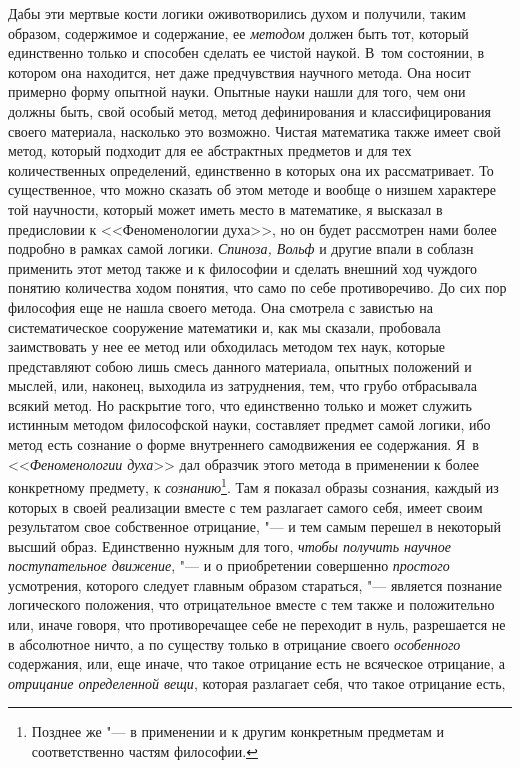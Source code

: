 Дабы эти мертвые кости логики оживотворились духом и получили, таким
образом, содержимое и содержание, ее {\em методом}
должен быть тот, который единственно только и способен сделать ее чистой
наукой. В~том состоянии, в котором она находится, нет даже предчувствия
научного метода. Она носит примерно форму опытной науки. Опытные науки
нашли для того, чем они должны быть, свой особый метод, метод дефинирования
и классифицирования своего материала, насколько это возможно. Чистая
математика также имеет свой метод, который подходит для ее абстрактных
предметов и для тех количественных определений, единственно в которых она
их рассматривает. То существенное, что можно сказать об этом методе и
вообще о низшем характере той научности, который может иметь место в
математике, я высказал в предисловии к <<Феноменологии духа>>, но он будет
рассмотрен нами более подробно в рамках самой логики.
{\em Спиноза, Вольф} и другие
впали в соблазн применить этот метод также и к философии и сделать внешний
ход чуждого понятию количества ходом понятия, что само по себе
противоречиво. До сих пор философия еще не нашла своего метода. Она
смотрела с завистью на систематическое сооружение математики и, как мы
сказали, пробовала заимствовать у нее ее метод или обходилась методом тех
наук, которые представляют собою лишь смесь данного материала, опытных
положений и мыслей, или, наконец, выходила из затруднения, тем, что грубо
отбрасывала всякий метод. Но раскрытие того, что единственно только и может
служить истинным методом философской науки, составляет предмет самой
логики, ибо метод есть сознание о форме внутреннего самодвижения ее
содержания. Я~в <<{\em Феноменологии духа}>> дал образчик
этого метода в применении к более конкретному предмету, к
{\em сознанию}\footnote{Позднее же "--- в применении
и к другим конкретным предметам и соответственно частям философии.}.
Там я показал образы сознания, каждый из которых в своей реализации вместе
с тем разлагает самого себя, имеет своим результатом свое собственное
отрицание, "--- и тем самым перешел в некоторый высший образ. Единственно
нужным для того, {\em чтобы получить научное
поступательное движение}, "--- и о приобретении совершенно
{\em простого} усмотрения, которого следует главным
образом стараться, "--- является познание логического положения, что
отрицательное вместе с тем также и положительно или, иначе говоря, что
противоречащее себе не переходит в нуль, разрешается не в абсолютное ничто,
а по существу только в отрицание своего
{\em особенного} содержания, или, еще иначе, что такое
отрицание есть не всяческое отрицание, а {\em отрицание
определенной вещи}, которая разлагает себя, что такое отрицание есть,
